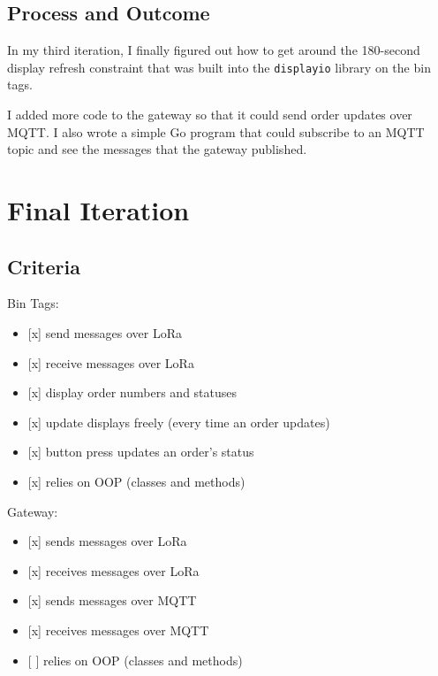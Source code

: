\documentclass{article}
\begin{document}
\subsection{Process and Outcome}\label{process-and-outcome-2}

In my third iteration, I finally figured out how to get around the
180-second display refresh constraint that was built into the
\texttt{displayio} library on the bin tags.~

I added more code to the gateway so that it could send order updates
over MQTT. I also wrote a simple Go program that could subscribe to an
MQTT topic and see the messages that the gateway published.

\section{Final Iteration}\label{final-iteration}

\subsection{Criteria}\label{criteria-4}

\noindent
Bin Tags:

\begin{itemize}
\item
  {[}x{]} send messages over LoRa
\item
  {[}x{]} receive messages over LoRa
\item
  {[}x{]} display order numbers and statuses
\item
  {[}x{]} update displays freely (every time an order updates)
\item
  {[}x{]} button press updates an order's status
\item
  {[}x{]} relies on OOP (classes and methods)
\end{itemize}

\noindent
Gateway:

\begin{itemize}
\item
  {[}x{]} sends messages over LoRa
\item
  {[}x{]} receives messages over LoRa
\item
  {[}x{]} sends messages over MQTT
\item
  {[}x{]} receives messages over MQTT
\item
  {[} {]} relies on OOP (classes and methods)
\end{itemize}
\end{document}
